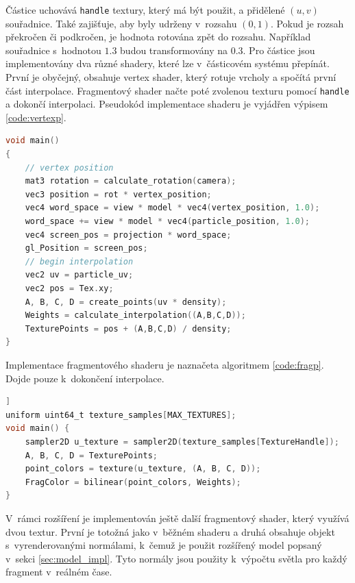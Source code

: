 Částice uchovává \texttt{handle} textury, který má být použit, a přidělené $(u,v)$ souřadnice. Také zajišťuje, aby byly udrženy v~rozsahu $(0,1)$. Pokud je rozsah překročen či podkročen, je hodnota rotována zpět do rozsahu. Například souřadnice s~hodnotou $1.3$ budou transformovány na $0.3$.
Pro částice jsou implementovány dva různé shadery, které lze v~částicovém systému přepínát. První je obyčejný, obsahuje vertex shader, který rotuje vrcholy a spočítá první část interpolace. Fragmentový shader načte poté zvolenou texturu pomocí \texttt{handle} a dokončí interpolaci. Pseudokód implementace shaderu je vyjádřen výpisem \ref{code:vertexp}.
\begin{lstlisting}[caption={Pseudokód vertex shaderu částic (zjednodušeno)}, label={code:vertexp}, language=C]
void main()
{
    // vertex position
    mat3 rotation = calculate_rotation(camera);
    vec3 position = rot * vertex_position;
    vec4 word_space = view * model * vec4(vertex_position, 1.0);
    word_space += view * model * vec4(particle_position, 1.0);
    vec4 screen_pos = projection * word_space;
    gl_Position = screen_pos;
    // begin interpolation
    vec2 uv = particle_uv;
    vec2 pos = Tex.xy;
    A, B, C, D = create_points(uv * density);
    Weights = calculate_interpolation((A,B,C,D));
    TexturePoints = pos + (A,B,C,D) / density;
}
\end{lstlisting}
Implementace fragmentového shaderu je naznačeta algoritmem \ref{code:fragp}. Dojde pouze k~dokončení interpolace.
\begin{lstlisting}[caption={Pseudokód fragmentového shaderu částic (zjednodušeno)}, label={code:fragp}, language=C]]
uniform uint64_t texture_samples[MAX_TEXTURES];
void main() {
    sampler2D u_texture = sampler2D(texture_samples[TextureHandle]);
    A, B, C, D = TexturePoints;
    point_colors = texture(u_texture, (A, B, C, D));
    FragColor = bilinear(point_colors, Weights);
}
\end{lstlisting}
V~rámci rozšíření je implementován ještě další fragmentový shader, který využívá dvou textur. První je totožná jako v~běžném shaderu a druhá obsahuje objekt s~vyrenderovanými normálami, k~čemuž je použit rozšířený model popsaný v~sekci \ref{sec:model_impl}. Tyto normály jsou použity k~výpočtu světla pro každý fragment v~reálném čase. 
    
